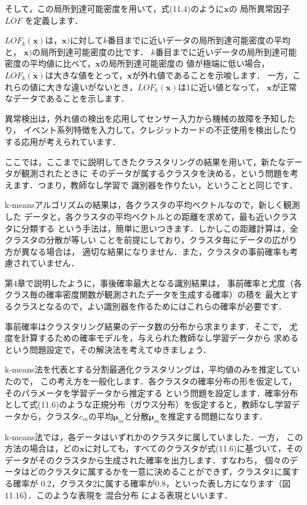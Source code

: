 そして，この局所到達可能密度を用いて，式(11.4)のように$\bm{x}$の
局所異常因子 $LOF$
を定義します．

$LOF_k(\bm{x})$は，$\bm{x})$に対して$k$番目までに近いデータの局所到達可能密度の平均と，
$\bm{x})$の局所到達可能密度の比です．
$k$番目までに近いデータの局所到達可能密度の平均値に比べて，$\bm{x}$の局所到達可能密度の
値が極端に低い場合，$LOF_k(\bm{x})$は大きな値をとって，$\bm{x}$が外れ値であることを示唆します．
一方，これらの値に大きな違いがないとき，$LOF_k(\bm{x})$は1に近い値となって，
$\bm{x}$が正常なデータであることを示します．

異常検出は，外れ値の検出を応用してセンサー入力から機械の故障を予知したり，
イベント系列特徴を入力して，クレジットカードの不正使用を検出したりする応用が考えられています．


ここでは，ここまでに説明してきたクラスタリングの結果を用いて，新たなデータが観測されたときに
そのデータが属するクラスタを決める，という問題を考えます．つまり，教師なし学習で
識別器を作りたい，ということと同じです．

k-meansアルゴリズムの結果は，各クラスタの平均ベクトルなので，新しく観測した
データと，各クラスタの平均ベクトルとの距離を求めて，最も近いクラスタに分類する
という手法は，簡単に思いつきます．しかしこの距離計算は，全クラスタの分散が等しい
ことを前提にしており，クラスタ毎にデータの広がり方が異なる場合は，
適切な結果になりません．また，クラスタの事前確率も考慮されていません．

第4章で説明したように，事後確率最大となる識別結果は，
事前確率と尤度（各クラス毎の確率密度関数が観測されたデータを生成する確率）の積を
最大とするクラスとなるので，よい識別器を作るためにはこれらの確率が必要です．

事前確率はクラスタリング結果のデータ数の分布から求まります．そこで，
尤度を計算するための確率モデルを，与えられた教師なし学習データから
求めるという問題設定で，その解決法を考えてゆきましょう．

k-means法を代表とする分割最適化クラスタリングは，平均値のみを推定していたので，
この考え方を一般化します．各クラスタの確率分布の形を仮定して，そのパラメータを学習データから推定する
という問題を設定します．確率分布として式(11.6)のような正規分布（ガウス分布）を仮定すると，教師なし学習データから，クラスタ$c_m$の平均$\bm{\mu}_m$と分散$\bm{\mu}_m$を推定する問題になります．

k-means法では，各データはいずれかのクラスタに属していました．一方，
この方法の場合は，どの$\bm{x}$に対しても，すべてのクラスタが式(11.6)に基づいて，そのデータがそのクラスタから生成された確率を出力します．すなわち，
個々のデータはどのクラスタに属するかを一意に決めることができず，クラスタ1に属する確率が
0.2，クラスタ2に属する確率が0.8，といった表し方になります（図11.16）．このような表現を
混合分布
による表現といいます．

